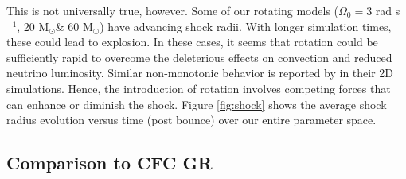 \documentclass[twocolumn,times]{aastex62}  %
\newcommand{\Msun}{\ensuremath{\mathrm{M}_\odot}\xspace}
\begin{document}
This is not universally true, however. 
Some of our rotating models ($\Omega_0 = 3$ rad s$^{-1}$, 20 \Msun \& 60 \Msun) have advancing shock radii.  With longer simulation times, these could lead to explosion.  In these cases, it seems that rotation could be sufficiently rapid to overcome the deleterious effects on convection and reduced neutrino luminosity.
Similar non-monotonic behavior is reported by \citet{summa:2018} in their 2D simulations.
Hence, the introduction of rotation involves competing forces that can enhance or diminish the shock.  Figure \ref{fig:shock} shows the average shock radius evolution versus time (post bounce) over our entire parameter space.



\subsection{Comparison to CFC GR}
\end{document}
